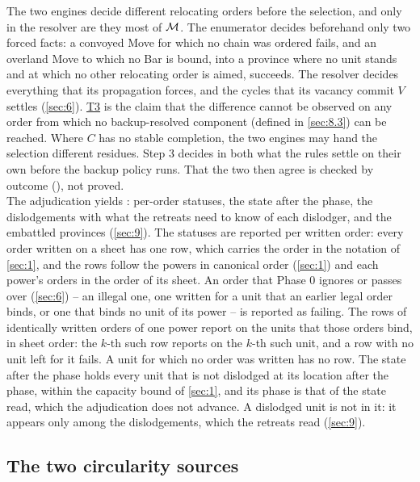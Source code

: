 \documentclass[12pt,a4paper]{article}
\begin{document}
The two engines decide different relocating orders before the selection, and only in the resolver are they most of $\mathcal{M}$.
The enumerator decides beforehand only two forced facts: a convoyed Move for which no chain was ordered fails, and an overland Move to which no Bar is bound, into a province where no unit stands and at which no other relocating order is aimed, succeeds.
The resolver decides everything that its propagation forces, and the cycles that its vacancy commit $V$ settles (\cref{sec:6}).
\hyperref[thm:T3]{T3} is the claim that the difference cannot be observed on any order from which no backup-resolved component (defined in \cref{sec:8.3}) can be reached.
Where $C$ has no stable completion, the two engines may hand the selection different residues.
Step 3 decides in both what the rules settle on their own before the backup policy runs.
That the two then agree is checked by outcome (), not proved.\\
The adjudication yields : per-order statuses, the state after the phase, the dislodgements with what the retreats need to know of each dislodger, and the embattled provinces (\cref{sec:9}).
The statuses are reported per written order: every order written on a sheet has one row, which carries the order in the notation of \cref{sec:1}, and the rows follow the powers in canonical order (\cref{sec:1}) and each power's orders in the order of its sheet.
An order that Phase 0 ignores or passes over (\cref{sec:6}) -- an illegal one, one written for a unit that an earlier legal order binds, or one that binds no unit of its power -- is reported as failing.
The rows of identically written orders of one power report on the units that those orders bind, in sheet order: the $k$-th such row reports on the $k$-th such unit, and a row with no unit left for it fails.
A unit for which no order was written has no row.
The state after the phase holds every unit that is not dislodged at its location after the phase, within the capacity bound of \cref{sec:1}, and its phase is that of the state read, which the adjudication does not advance.
A dislodged unit is not in it: it appears only among the dislodgements, which the retreats read (\cref{sec:9}).

\subsection{The two circularity sources}\label{sec:5.2}
\end{document}
